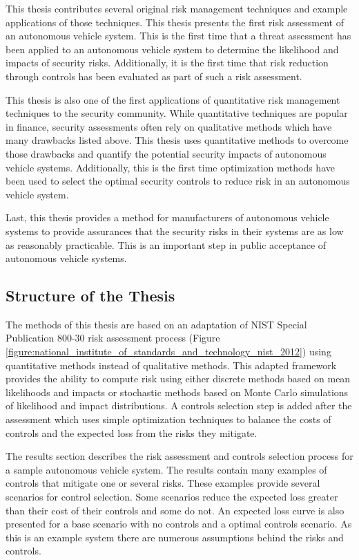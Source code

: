 \documentclass{article}
\begin{document}
This thesis contributes several original risk management techniques and example applications of those techniques. This thesis presents the first risk assessment of an autonomous vehicle system. This is the first time that a threat assessment has been applied to an autonomous vehicle system to determine the likelihood and impacts of security risks. Additionally, it is the first time that risk reduction through controls has been evaluated as part of such a risk assessment.

This thesis is also one of the first applications of quantitative risk management techniques to the security community. While quantitative techniques are popular in finance, security assessments often rely on qualitative methods which have many drawbacks listed above. This thesis uses quantitative methods to overcome those drawbacks and quantify the potential security impacts of autonomous vehicle systems. Additionally, this is the first time optimization methods have been used to select the optimal security controls to reduce risk in an autonomous vehicle system.

Last, this thesis provides a method for manufacturers of autonomous vehicle systems to provide assurances that the security risks in their systems are as low as reasonably practicable. This is an important step in public acceptance of autonomous vehicle systems.

\subsection{Structure of the Thesis}

The methods of this thesis are based on an adaptation of NIST Special Publication 800-30 risk assessment process (Figure \ref{figure:national_institute_of_standards_and_technology_nist_2012}) using quantitative methods instead of qualitative methods. This adapted framework provides the ability to compute risk using either discrete methods based on mean likelihoods and impacts or stochastic methods based on Monte Carlo simulations of likelihood and impact distributions. A controls selection step is added after the assessment which uses simple optimization techniques to balance the costs of controls and the expected loss from the risks they mitigate. 

The results section describes the risk assessment and controls selection process for a sample autonomous vehicle system. The results contain many examples of controls that mitigate one or several risks. These examples provide several scenarios for control selection. Some scenarios reduce the expected loss greater than their cost of their controls and some do not. An expected loss curve is also presented for a base scenario with no controls and a optimal controls scenario. As this is an example system there are numerous assumptions behind the risks and controls.
\end{document}
